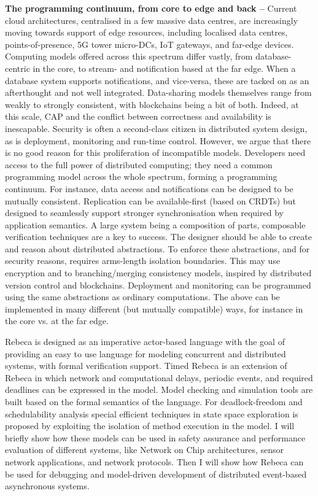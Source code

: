 \documentclass[a4paper,UKenglish]{dagrep-v2018}
\begin{document}
\textbf{The programming continuum, from core to edge and back --}
Current cloud architectures, centralised in a few massive data centres, are increasingly moving towards support of edge resources, including localised data centres, points-of-presence, 5G tower micro-DCs, IoT gateways, and far-edge devices. Computing models offered across this spectrum differ vastly, from database-centric in the core, to stream- and notification based at the far edge. When a database system supports notifications, and vice-versa, these are tacked on as an afterthought and not well integrated. Data-sharing models themselves range from weakly to strongly consistent, with blockchains being a bit of both. Indeed, at this scale, CAP and the conflict between correctness and availability is inescapable. Security is often a second-class citizen in distributed system design, as is deployment, monitoring and run-time control. However, we argue that there is no good reason for this proliferation of incompatible models. Developers need access to the full power of distributed computing; they need a common programming model across the whole spectrum, forming a programming continuum. For instance, data access and notifications can be designed to be mutually consistent. Replication can be available-first (based on CRDTs) but designed to seamlessly support stronger synchronisation when required by application semantics. A large system being a composition of parts, composable verification techniques are a key to success. The designer should be able to create and reason about distributed abstractions. To enforce these abstractions, and for security reasons, requires arms-length isolation boundaries. This may use encryption and to branching/merging consistency models, inspired by distributed version control and blockchains. Deployment and monitoring can be programmed using the same abstractions as ordinary computations. The above can be implemented in many different (but mutually compatible) ways, for instance in the core vs. at the far edge.



\license

Rebeca is designed as an imperative actor-based language with the goal of providing an easy to use language for modeling concurrent and distributed systems, with formal verification support.
Timed Rebeca is an extension of Rebeca in which network and computational delays, periodic events, and required deadlines can be expressed in the model. Model checking and simulation tools are built based on the formal semantics of the language. For deadlock-freedom and schedulability analysis special efficient techniques in state space exploration is proposed by exploiting the isolation of method execution in the model. I will briefly show how these models can be used in safety assurance and performance evaluation of different systems, like Network on Chip architectures, sensor network applications, and network protocols. Then I will show how Rebeca can be used for debugging and model-driven development of distributed event-based asynchronous systems.
\end{document}
